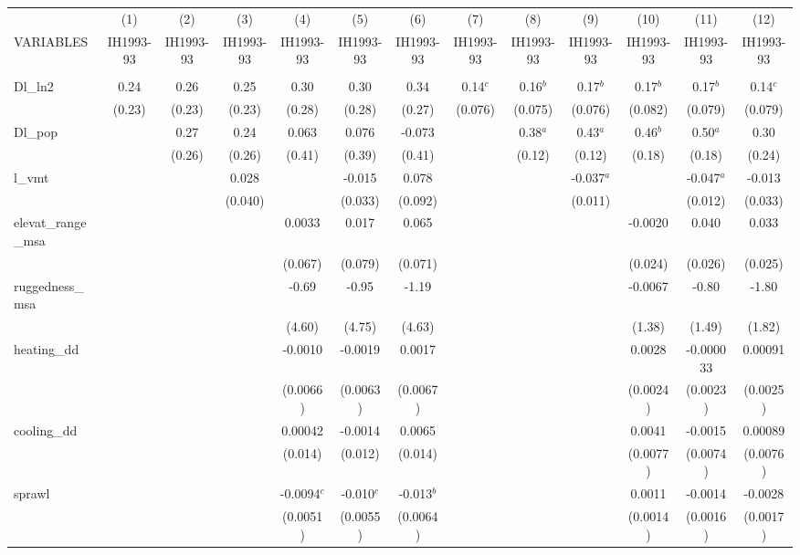 \documentclass[]{article}
\begin{document}
\begin{tabular}{lcccccccccccc} \hline
 & (1) & (2) & (3) & (4) & (5) & (6) & (7) & (8) & (9) & (10) & (11) & (12) \\
VARIABLES & IH1993-93 & IH1993-93 & IH1993-93 & IH1993-93 & IH1993-93 & IH1993-93 & IH1993-93 & IH1993-93 & IH1993-93 & IH1993-93 & IH1993-93 & IH1993-93 \\ \hline
 &  &  &  &  &  &  &  &  &  &  &  &  \\
Dl\_ln2 & 0.24 & 0.26 & 0.25 & 0.30 & 0.30 & 0.34 & 0.14$^c$ & 0.16$^b$ & 0.17$^b$ & 0.17$^b$ & 0.17$^b$ & 0.14$^c$ \\
 & (0.23) & (0.23) & (0.23) & (0.28) & (0.28) & (0.27) & (0.076) & (0.075) & (0.076) & (0.082) & (0.079) & (0.079) \\
Dl\_pop &  & 0.27 & 0.24 & 0.063 & 0.076 & -0.073 &  & 0.38$^a$ & 0.43$^a$ & 0.46$^b$ & 0.50$^a$ & 0.30 \\
 &  & (0.26) & (0.26) & (0.41) & (0.39) & (0.41) &  & (0.12) & (0.12) & (0.18) & (0.18) & (0.24) \\
l\_vmt &  &  & 0.028 &  & -0.015 & 0.078 &  &  & -0.037$^a$ &  & -0.047$^a$ & -0.013 \\
 &  &  & (0.040) &  & (0.033) & (0.092) &  &  & (0.011) &  & (0.012) & (0.033) \\
elevat\_range\_msa &  &  &  & 0.0033 & 0.017 & 0.065 &  &  &  & -0.0020 & 0.040 & 0.033 \\
 &  &  &  & (0.067) & (0.079) & (0.071) &  &  &  & (0.024) & (0.026) & (0.025) \\
ruggedness\_msa &  &  &  & -0.69 & -0.95 & -1.19 &  &  &  & -0.0067 & -0.80 & -1.80 \\
 &  &  &  & (4.60) & (4.75) & (4.63) &  &  &  & (1.38) & (1.49) & (1.82) \\
heating\_dd &  &  &  & -0.0010 & -0.0019 & 0.0017 &  &  &  & 0.0028 & -0.000033 & 0.00091 \\
 &  &  &  & (0.0066) & (0.0063) & (0.0067) &  &  &  & (0.0024) & (0.0023) & (0.0025) \\
cooling\_dd &  &  &  & 0.00042 & -0.0014 & 0.0065 &  &  &  & 0.0041 & -0.0015 & 0.00089 \\
 &  &  &  & (0.014) & (0.012) & (0.014) &  &  &  & (0.0077) & (0.0074) & (0.0076) \\
sprawl &  &  &  & -0.0094$^c$ & -0.010$^c$ & -0.013$^b$ &  &  &  & 0.0011 & -0.0014 & -0.0028 \\
 &  &  &  & (0.0051) & (0.0055) & (0.0064) &  &  &  & (0.0014) & (0.0016) & (0.0017) \\

\end{tabular}
\end{document}
